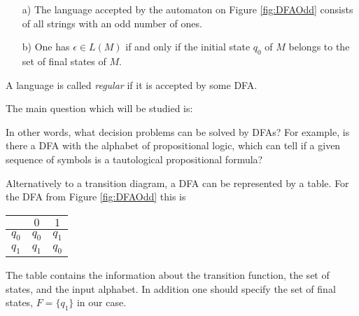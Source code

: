 \begin{page}

\begin{exl}
\par\noindent
\begin{enumerate}
\item[a)]
The language accepted by the automaton on Figure \ref{fig:DFAOdd} consists of all strings with an odd number of ones.
\item[b)]
One has $\epsilon \in L(M)$ if and only if the initial state $q_0$ of $M$ belongs to the set of final states of $M$.
\end{enumerate}
\end{exl}

\end{page}

\begin{page}

\begin{dfn}
A language is called \emph{regular} if it is accepted by some DFA.
\end{dfn}

\end{page}

\begin{page}


The main question which will be studied is:
\begin{center}
\end{center}

In other words, what decision problems can be solved by DFAs?
For example, is there a DFA with the alphabet of propositional logic, which can tell if a given sequence of symbols is a tautological propositional formula?


\end{page}

\begin{page}

\begin{rem}
Alternatively to a transition diagram, a DFA can be represented by a table.
For the DFA from Figure \ref{fig:DFAOdd} this is
\begin{center}
\begin{tabular}{c|cc}
& $0$ & $1$\\
\hline
$q_0$ & $q_0$ & $q_1$\\
$q_1$ & $q_1$ & $q_0$
\end{tabular}
\end{center}
The table contains the information about the transition function, the set of states, and the input alphabet.
In addition one should specify the set of final states, $F = \{q_1\}$ in our case.
\end{rem}

\end{page}

